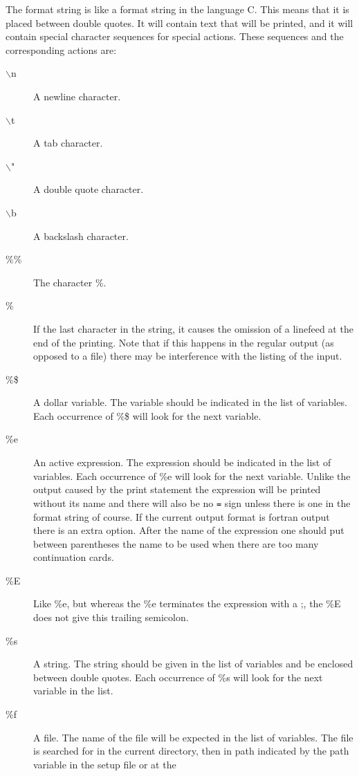 The format string is like a format string in the 
language C. This means 
that it is placed between double quotes. It will contain text that will be 
printed, and it will contain special character sequences for special 
actions. These sequences and the corresponding actions are:
\begin{description}
\item[$\backslash$n] A newline character.
\item[$\backslash$t] A tab character.
\item[$\backslash$"] A double quote character.
\item[$\backslash$b] A backslash character.
\item[\%\%] The character \%\index{\%}.
\item[\%] If the last character in the string, it causes the omission of a 
linefeed at the end of the printing. Note that if this 
happens in the regular output (as opposed to a file) there may be 
interference with the listing of the input.
\item[\%\$] A dollar variable. The variable should be 
indicated in the list of variables. Each occurrence of \%\$ will look for 
the next variable.
\item[\%e] An active expression. The expression should be 
indicated in the list of variables. Each occurrence of \%e will look for 
the next variable. Unlike the output caused by the print statement the 
expression will be printed without its name and there will also be no 
\verb:=: sign unless there is one in the format string of course. If the 
current output format is fortran output there is an extra option. After the 
name of the expression one should put between parentheses the name to be 
used when there are too many continuation cards.
\item[\%E] Like \%e, but whereas the \%e terminates the expression with a 
;, the \%E does not give this trailing semicolon.
\item[\%s] A string. The string should be 
given in the list of variables and be enclosed between double quotes. Each 
occurrence of \%s will look for the next variable in the list.
\item[\%f] A file. The name of the file will be expected in the 
list of variables. The file is searched for in the current directory, then 
in path indicated by the path variable in the setup file or at the 

\end{description}
